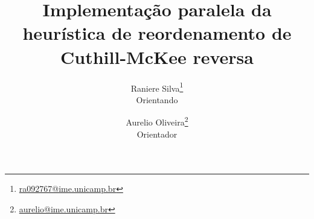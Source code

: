 \documentclass[12pt,a4paper]{article}
\begin{document}
\title{Implementação paralela da heurística de reordenamento
de Cuthill-McKee reversa}
\author{Raniere Silva\footnote{\url{ra092767@ime.unicamp.br}} \\ Orientando
\and Aurelio Oliveira\footnote{\url{aurelio@ime.unicamp.br}} \\ Orientador}
\maketitle

\tableofcontents





%


\end{document}
